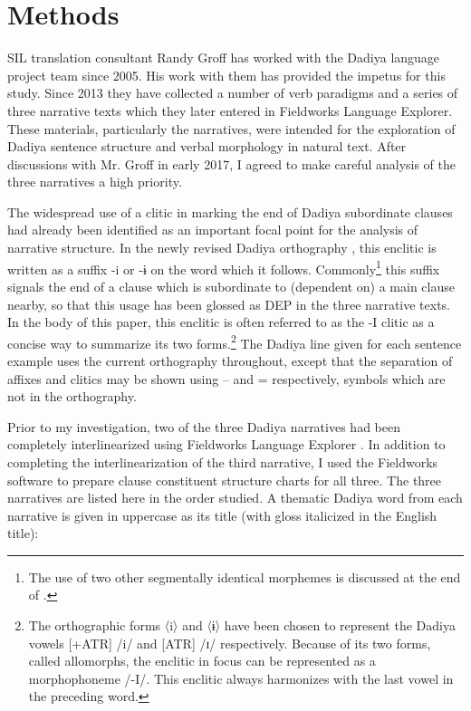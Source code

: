 \documentclass[output=paper]{langscibook}
\begin{document}
\section{Methods}

SIL translation consultant Randy Groff has worked with the Dadiya language project team since 2005. His work with them has provided the impetus for this study. Since 2013 they have collected a number of verb paradigms and a series of three narrative texts which they later entered in Fieldworks Language Explorer. These materials, particularly the narratives, were intended for the exploration of Dadiya sentence structure and verbal morphology in natural text. After discussions with Mr. Groff in early 2017, I agreed to make careful analysis of the three narratives a high priority.

\begin{sloppypar}
The widespread use of a clitic in marking the end of Dadiya subordinate clauses had already been identified as an important focal point for the analysis of narrative structure. In the newly revised Dadiya orthography \citep{Committee2018}, this enclitic is written as a suffix -i or -ɨ on the word which it follows. Commonly\footnote{The use of two other segmentally identical morphemes is discussed at the end of .} this suffix signals the end of a clause which is subordinate to (dependent on) a main clause nearby, so that this usage has been glossed as DEP in the three narrative texts. In the body of this paper, this enclitic is often referred to as the -I clitic as a concise way to summarize its two forms.\footnote{The orthographic forms 〈i〉 and 〈ɨ〉 have been chosen to represent the Dadiya vowels [+ATR] /i/ and [\textminus ATR] /ɪ/ respectively. Because of its two forms, called allomorphs, the enclitic in focus can be represented as a morphophoneme /-I/. This enclitic always harmonizes with the last vowel in the preceding word.} The Dadiya line given for each sentence example uses the current orthography throughout, except that the separation of affixes and clitics may be shown using – and = respectively, symbols which are not in the orthography.
\end{sloppypar}

Prior to my investigation, two of the three Dadiya narratives had been completely interlinearized using Fieldworks Language Explorer \citep{SILInternational2019a}. In addition to completing the interlinearization of the third narrative, I used the Fieldworks software to prepare clause constituent structure charts for all three. The three narratives are listed here in the order studied. A thematic Dadiya word from each narrative is given in uppercase as its title (with gloss italicized in the English title):
\end{document}
